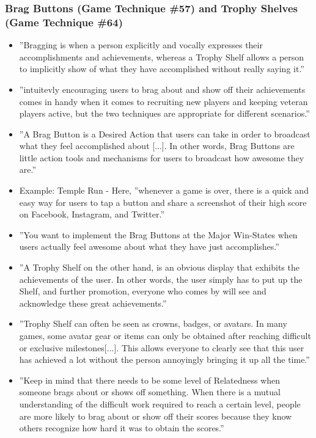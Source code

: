 \subsubsection{Brag Buttons (Game Technique \#57) and Trophy Shelves (Game Technique \#64)}
    \begin{itemize}
        \item ''Bragging is when a person explicitly and vocally expresses their accomplishments and achievements, whereas a Trophy Shelf allows a person to implicitly show of what they have accomplished without really saying it.''
        \item ''intuitevly encouraging users to brag about and show off their achievements comes in handy when it comes to recruiting new players and keeping veteran players active, but the two techniques are appropriate for different scenarios.''
        \item ''A Brag Button is a Desired Action that users can take in order to broadcast what they feel accomplished about [...]. In other words, Brag Buttons are little action tools and mechanisms for users to broadcast how awesome they are.''
        \item Example: Temple Run - Here, ''whenever a game is over, there is a quick and easy way for users to tap a button and share a screenshot of their high score on Facebook, Instagram, and Twitter.''
        \item ''You want to implement the Brag Buttons at the Major Win-States when users actually feel awesome about what they have just accomplishes.''
        \item ''A Trophy Shelf on the other hand, is an obvious display that exhibits the achievements of the user. In other words, the user simply has to put up the Shelf, and further promotion, everyone who comes by will see and acknowledge these great achievements.''
        \item ''Trophy Shelf can often be seen as crowns, badges, or avatars. In many games, some avatar gear or items can only be obtained after reaching difficult or exclusive milestones[...]. This allows everyone to clearly see that this user has achieved a lot without the person annoyingly bringing it up all the time.''
        \item ''Keep in mind that there needs to be some level of Relatedness when someone brags about or shows off something. When there is a mutual understanding of the difficult work required to reach a certain level, people are more likely to brag about or show off their scores because they know others recognize how hard it was to obtain the scores.''
    \end{itemize}
    
